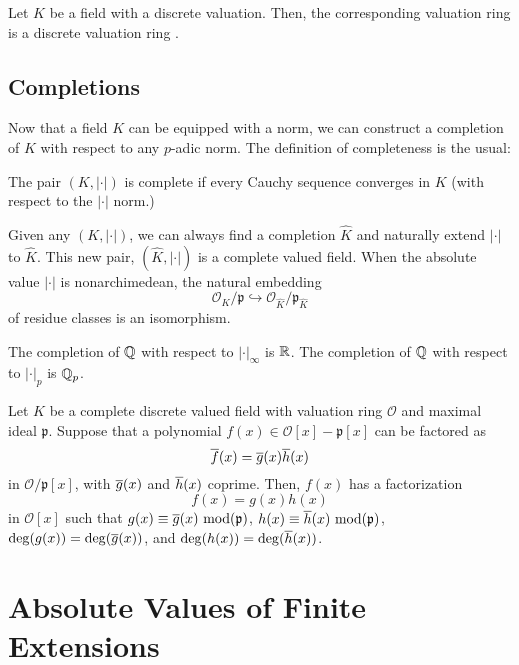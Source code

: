 \begin{proposition}
    Let $K$ be a field with a discrete valuation. Then, the corresponding valuation ring is a discrete valuation ring .
\end{proposition}

\subsection{Completions}

Now that a field $K$ can be equipped with a norm, we can construct a completion of $K$ with respect to any $p$-adic norm. The definition of completeness is the usual:

\begin{definition}[Complete]
    The pair $(K, |\cdot|)$ is complete if every Cauchy sequence converges in $K$ (with respect to the $|\cdot|$ norm.)
\end{definition}

Given any $(K, |\cdot|)$, we can always find a completion $\hat{K}$ and naturally extend $|\cdot|$ to $\hat{K}$. This new pair, $(\hat{K}, |\cdot|)$ is a complete valued field. When the absolute value $|\cdot|$ is nonarchimedean, the natural embedding
    \[\mathcal{O}_{K}/\mathfrak{p} \hookrightarrow \mathcal{O}_{\hat{K}}/\mathfrak{p}_{\hat{K}}\]
of residue classes is an isomorphism.

\begin{example}
    The completion of $\mathbb{Q}$ with respect to $|\cdot|_\infty$ is $\mathbb{R}$. The completion of $\mathbb{Q}$ with respect to $|\cdot|_p$ is $\mathbb{Q}_p$.
\end{example}

\begin{theorem}
    Let $K$ be a complete discrete valued field with valuation ring $\mathcal{O}$ and maximal ideal $\mathfrak{p}$. Suppose that a polynomial $f(x) \in \mathcal{O}[x] - \mathfrak{p}[x]$ can be factored as
        \[\overline{f}(x) = \overline{g}(x)\overline{h}(x)\]
    in $\mathcal{O}/\mathfrak{p}[x]$, with $\overline{g}(x)$ and $\overline{h}(x)$ coprime. Then, $f(x)$ has a factorization
        \[f(x) = g(x) h(x)\]
    in $\mathcal{O}[x]$ such that $g(x) \equiv \overline{g}(x) \textrm{ mod}(\mathfrak{p})$, $h(x) \equiv \overline{h}(x) \textrm{ mod}(\mathfrak{p})$, $\deg(g(x)) = \deg(\overline{g}(x))$, and $\deg(h(x)) = \deg(\overline{h}(x))$.
\end{theorem}

\section{Absolute Values of Finite Extensions}


